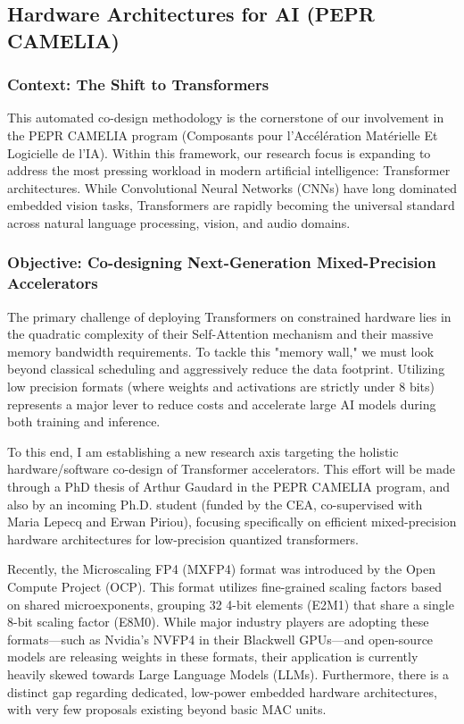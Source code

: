 \documentclass[11pt]{report}
\begin{document}
\subsection{Hardware Architectures for AI (PEPR CAMELIA)}

\subsubsection{Context: The Shift to Transformers}
This automated co-design methodology is the cornerstone of our involvement in the PEPR CAMELIA program (Composants pour l'Accélération Matérielle Et Logicielle de l'IA). Within this framework, our research focus is expanding to address the most pressing workload in modern artificial intelligence: Transformer architectures. While Convolutional Neural Networks (CNNs) have long dominated embedded vision tasks, Transformers are rapidly becoming the universal standard across natural language processing, vision, and audio domains.

\subsubsection{Objective: Co-designing Next-Generation Mixed-Precision Accelerators}
The primary challenge of deploying Transformers on constrained hardware lies in the quadratic complexity of their Self-Attention mechanism and their massive memory bandwidth requirements. To tackle this "memory wall," we must look beyond classical scheduling and aggressively reduce the data footprint. Utilizing low precision formats (where weights and activations are strictly under 8 bits) represents a major lever to reduce costs and accelerate large AI models during both training and inference.

To this end, I am establishing a new research axis targeting the holistic hardware/software co-design of Transformer accelerators. This effort will be made through a PhD thesis of Arthur Gaudard in the PEPR CAMELIA program, and also by an incoming Ph.D. student (funded by the CEA, co-supervised with Maria Lepecq and Erwan Piriou), focusing specifically on efficient mixed-precision hardware architectures for low-precision quantized transformers.

Recently, the Microscaling FP4 (MXFP4) format was introduced by the Open Compute Project (OCP). This format utilizes fine-grained scaling factors based on shared microexponents, grouping 32 4-bit elements (E2M1) that share a single 8-bit scaling factor (E8M0). While major industry players are adopting these formats—such as Nvidia's NVFP4 in their Blackwell GPUs—and open-source models are releasing weights in these formats, their application is currently heavily skewed towards Large Language Models (LLMs). Furthermore, there is a distinct gap regarding dedicated, low-power embedded hardware architectures, with very few proposals existing beyond basic MAC units.
\end{document}
